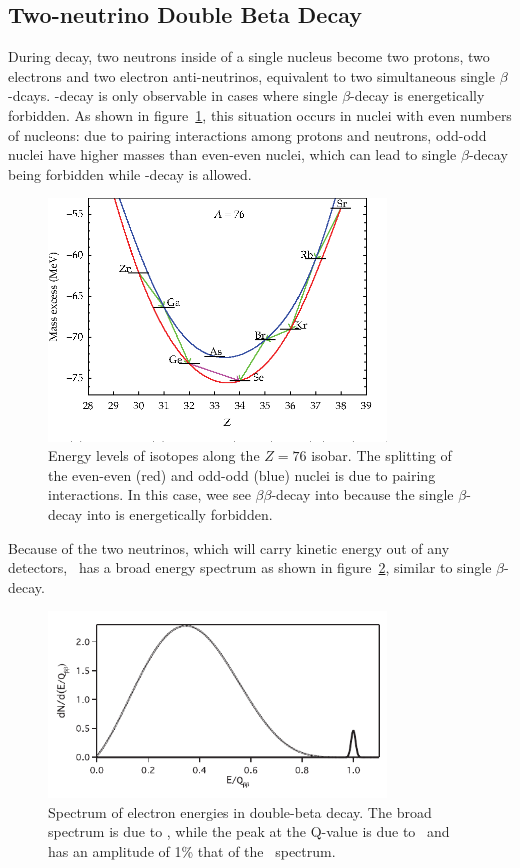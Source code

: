 \documentclass[/main.tex]{subfiles}
\begin{document}
\subsection{Two-neutrino Double Beta Decay}
During \tnbb decay, two neutrons inside of a single nucleus become two protons, two electrons and two electron anti-neutrinos, equivalent to two simultaneous single $\beta$-dcays.
\bb -decay is only observable in cases where single $\beta$-decay is energetically forbidden.
As shown in figure~\ref{fig:bballowed}, this situation occurs in nuclei with even numbers of nucleons: due to pairing interactions among protons and neutrons, odd-odd nuclei have higher masses than even-even nuclei, which can lead to single $\beta$-decay being forbidden while \bb -decay is allowed.
\begin{figure}[t]
  \centering
  \includegraphics[width=0.8\textwidth]{bballowed}
  \caption[Allowed $\beta\beta$ Isobar]{\label{fig:bballowed}
    Energy levels of isotopes along the $Z=76$ isobar. The splitting of the even-even (red) and odd-odd (blue) nuclei is due to pairing interactions. In this case, wee see  $\beta\beta$-decay into  because the single $\beta$-decay into  is energetically forbidden.
  }
\end{figure}
Because of the two neutrinos, which will carry kinetic energy out of any detectors, \tnbb\ has a broad energy spectrum as shown in figure~\ref{fig:bbspectrum}, similar to single $\beta$-decay.
\begin{figure}[t]
  \centering
  \includegraphics[width=0.8\textwidth]{bbSpectrum}
  \caption[Energy Spectrum of \tnbb\ and \znbb]{\label{fig:bbspectrum}
    Spectrum of electron energies in double-beta decay. The broad spectrum is due to \tnbb, while the peak at the Q-value is due to \znbb\ and has an amplitude of 1\% that of the \tnbb\ spectrum.
  }
\end{figure}
\end{document}
